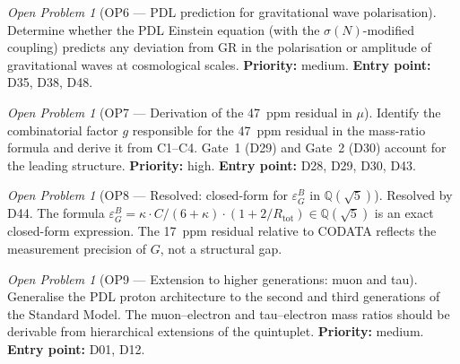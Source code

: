\documentclass[11pt,a4paper]{article}
\theoremstyle{plain}
\theoremstyle{definition}
\theoremstyle{remark}
\newtheorem{openproblem}[theorem]{Open Problem}
\newcommand{\Rtot}{R_{\mathrm{tot}}}
\newcommand{\sigmaN}{\sigma(N)}
\newcommand{\epsGeomB}{\varepsilon_G^B}
\begin{document}
\begin{openproblem}[OP6 --- PDL prediction for gravitational wave polarisation]
\label{op:GW}
Determine whether the PDL Einstein equation (with the $\sigmaN$-modified coupling) predicts any deviation from GR in the polarisation or amplitude of gravitational waves at cosmological scales. \textbf{Priority:} medium. \textbf{Entry point:} D35, D38, D48.
\end{openproblem}

\begin{openproblem}[OP7 --- Derivation of the 47~ppm residual in $\mu$]
\label{op:residual}
Identify the combinatorial factor $g$ responsible for the 47~ppm residual in the mass-ratio formula and derive it from C1--C4. Gate~1 (D29) and Gate~2 (D30) account for the leading structure. \textbf{Priority:} high. \textbf{Entry point:} D28, D29, D30, D43.
\end{openproblem}

\begin{openproblem}[OP8 --- Resolved: closed-form for $\epsGeomB$ in $\mathbb{Q}(\sqrt{5})$]
\label{op:epsGeomB}
\textcolor{proofblue}{Resolved by D44.} The formula $\epsGeomB = \kappa \cdot C/(6+\kappa)\cdot(1+2/\Rtot) \in \mathbb{Q}(\sqrt{5})$ is an exact closed-form expression. The 17~ppm residual relative to CODATA reflects the measurement precision of $G$, not a structural gap.
\end{openproblem}

\begin{openproblem}[OP9 --- Extension to higher generations: muon and tau]
\label{op:generations}
Generalise the PDL proton architecture to the second and third generations of the Standard Model. The muon--electron and tau--electron mass ratios should be derivable from hierarchical extensions of the quintuplet. \textbf{Priority:} medium. \textbf{Entry point:} D01, D12.
\end{openproblem}
\end{document}
